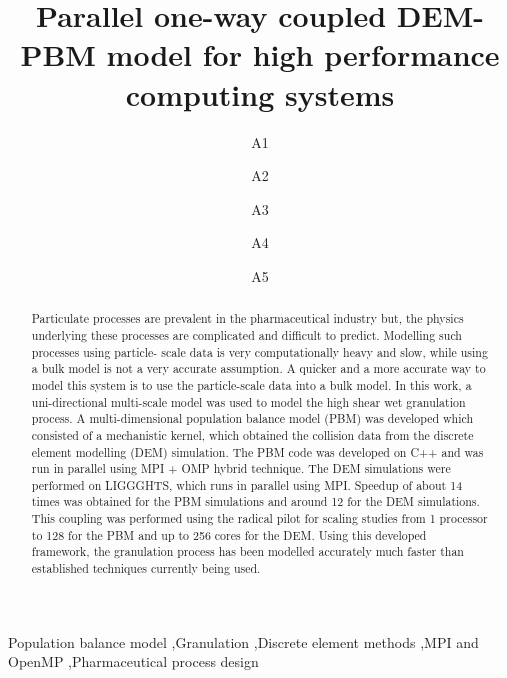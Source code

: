 \documentclass[preprint,11pt,authoryear]{elsarticle}
\begin{document}
\begin{frontmatter}
\title{Parallel one-way coupled DEM-PBM model for high performance computing systems}
\author{A1 }
\author{A2 }
\author{A3 }
\author{A4 }
\author{A5} 
\address{Department of Chemical and Biochemical Engineering, Rutgers, The State University of New
Jersey, Piscataway, NJ, USA 08854}
\begin{abstract}
Particulate processes are prevalent in the pharmaceutical industry but, the physics underlying 
these processes are complicated and difficult to predict. Modelling such processes using particle-
scale data is very computationally heavy and slow, while using a bulk model is not a very accurate
assumption. A quicker and a more accurate way to model this system is to use the particle-scale data 
into a bulk model. In this work, a uni-directional multi-scale model was used to model the high shear wet granulation 
process. A multi-dimensional population balance model (PBM) was developed which 
consisted of a mechanistic kernel, which obtained the collision data from the discrete element 
modelling (DEM) simulation. The PBM code was developed on 
C++ and was run in parallel using MPI + OMP hybrid technique. The DEM simulations were performed on
LIGGGHTS, which runs in parallel using MPI. Speedup of about 14 times was obtained for the PBM 
simulations and around 12 for the DEM simulations. This coupling was performed using the radical 
pilot for scaling studies from 1 processor to 128 for the PBM and up to 256 cores for the DEM. Using 
this developed framework, the granulation process has been modelled accurately much faster than
established techniques currently being used.
\end{abstract}
\begin{keyword}
Population balance model \sep Granulation \sep Discrete element methods  \sep MPI and OpenMP 
\sep Pharmaceutical process design
\end{keyword}
\end{frontmatter}
\linenumbers
\end{document}
